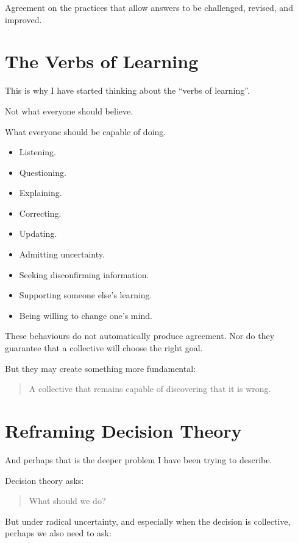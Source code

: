 \documentclass{article}
\begin{document}
Agreement on the practices that allow answers to be challenged, revised, and improved.

\section*{The Verbs of Learning}

This is why I have started thinking about the ``verbs of learning''.

Not what everyone should believe.

What everyone should be capable of doing.

\begin{itemize}
    \item Listening.
    \item Questioning.
    \item Explaining.
    \item Correcting.
    \item Updating.
    \item Admitting uncertainty.
    \item Seeking disconfirming information.
    \item Supporting someone else's learning.
    \item Being willing to change one's mind.
\end{itemize}

These behaviours do not automatically produce agreement. Nor do they guarantee that a collective will choose the right goal.

But they may create something more fundamental:

\begin{quote}
    A collective that remains capable of discovering that it is wrong.
\end{quote}

\section*{Reframing Decision Theory}

And perhaps that is the deeper problem I have been trying to describe.

Decision theory asks:

\begin{quote}
    What should we do?
\end{quote}

But under radical uncertainty, and especially when the decision is collective, perhaps we also need to ask:
\end{document}
